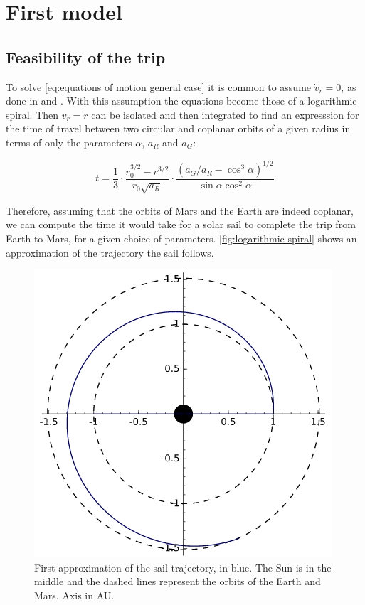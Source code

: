 \documentclass[twocolumn,12pt,a4paper]{article}
\numberwithin{equation}{section}
\begin{document}
\section{First model}
\subsection{Feasibility of the trip}
To solve \autoref{eq:equations of motion general case} it is common to assume \( \dot{v}_r = 0\), as done in \cite{tsu} and \cite{mcinnes}. With this assumption the equations become those of a logarithmic spiral. Then \( v_r = \dot{r} \) can be isolated and then integrated to find an expresssion for the time of travel between two circular and coplanar orbits of a given radius in terms of only the parameters \( \alpha \), \( a_R \) and \( a_G \):

\begin{equation} \label{eq:time of flight between orbits}
	t=\frac{1}{3}\cdot\frac{r_0^{3/2}-r^{3/2}}{r_0\sqrt{a_R}}\cdot\frac{(a_G/a_R-\cos^3\alpha)^{1/2}}{\sin\alpha\cos^2\alpha}
\end{equation}

Therefore, assuming that the orbits of Mars and the Earth are indeed coplanar, we can compute the time it would take for a solar sail to complete the trip from Earth to Mars, for a given choice of parameters. \autoref{fig:logarithmic spiral} shows an approximation of the trajectory the sail follows.

\begin{figure}
	\centering
	\includegraphics[scale=0.5]{espiral.png}
	\caption{First approximation of the sail trajectory, in blue. The Sun is in the middle and the dashed lines represent the orbits of the Earth and Mars. Axis in AU.}
	\label{fig:logarithmic spiral}
\end{figure}
\end{document}
